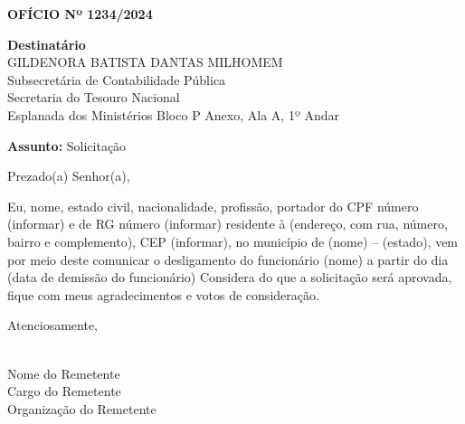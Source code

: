 \documentclass{article}
\begin{document}
    \begin{center}
        \textbf{OFÍCIO Nº 1234/2024}
    \end{center}

    \vspace{1cm}

    \begin{flushright}
        \textbf{Destinatário} \\
        GILDENORA BATISTA DANTAS MILHOMEM \\
        Subsecretária de Contabilidade Pública \\
        Secretaria do Tesouro Nacional \\
        Esplanada dos Ministérios Bloco P Anexo, Ala A, 1º Andar
    \end{flushright}

    \vspace{1cm}

    \textbf{Assunto:} Solicitação

    \vspace{1cm}

    Prezado(a) Senhor(a),

    \bigskip

    Eu, nome, estado civil, nacionalidade, profissão, portador do CPF número (informar) e de RG número (informar) residente à (endereço, com rua, número, bairro e complemento), CEP (informar), no município de (nome) – (estado), vem por meio deste comunicar o desligamento do funcionário (nome)
         a partir do dia (data de demissão do funcionário) Considera do que a solicitação será aprovada, fique com meus agradecimentos e votos de consideração.

    \bigskip

    Atenciosamente,

    \vspace{1cm}

    \hrulefill \\
    Nome do Remetente \\
    Cargo do Remetente \\
    Organização do Remetente \\

    
\end{document}
